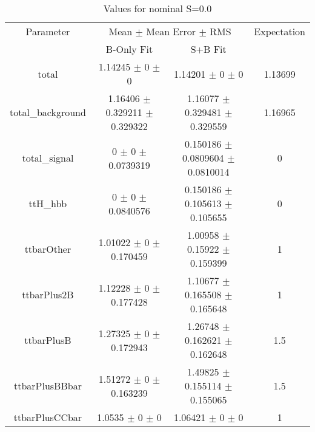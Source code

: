 \begin{table}
\centering
\caption{Values for nominal S=0.0}
\begin{tabular}{cccc}
\toprule
Parameter & \multicolumn{2}{c}{Mean $\pm$ Mean Error $\pm$ RMS} & Expectation\\
 & B-Only Fit & S+B Fit & \\
\midrule
total & \num{1.14245} $\pm$ \num{0} $\pm$ \num{0} & \num{1.14201} $\pm$ \num{0} $\pm$ \num{0} & \num{1.13699}\\
total\_background & \num{1.16406} $\pm$ \num{0.329211} $\pm$ \num{0.329322} & \num{1.16077} $\pm$ \num{0.329481} $\pm$ \num{0.329559} & \num{1.16965}\\
total\_signal & \num{0} $\pm$ \num{0} $\pm$ \num{0.0739319} & \num{0.150186} $\pm$ \num{0.0809604} $\pm$ \num{0.0810014} & \num{0}\\
ttH\_hbb & \num{0} $\pm$ \num{0} $\pm$ \num{0.0840576} & \num{0.150186} $\pm$ \num{0.105613} $\pm$ \num{0.105655} & \num{0}\\
ttbarOther & \num{1.01022} $\pm$ \num{0} $\pm$ \num{0.170459} & \num{1.00958} $\pm$ \num{0.15922} $\pm$ \num{0.159399} & \num{1}\\
ttbarPlus2B & \num{1.12228} $\pm$ \num{0} $\pm$ \num{0.177428} & \num{1.10677} $\pm$ \num{0.165508} $\pm$ \num{0.165648} & \num{1}\\
ttbarPlusB & \num{1.27325} $\pm$ \num{0} $\pm$ \num{0.172943} & \num{1.26748} $\pm$ \num{0.162621} $\pm$ \num{0.162648} & \num{1.5}\\
ttbarPlusBBbar & \num{1.51272} $\pm$ \num{0} $\pm$ \num{0.163239} & \num{1.49825} $\pm$ \num{0.155114} $\pm$ \num{0.155065} & \num{1.5}\\
ttbarPlusCCbar & \num{1.0535} $\pm$ \num{0} $\pm$ \num{0} & \num{1.06421} $\pm$ \num{0} $\pm$ \num{0} & \num{1}\\
\bottomrule
\end{tabular}
\end{table}
